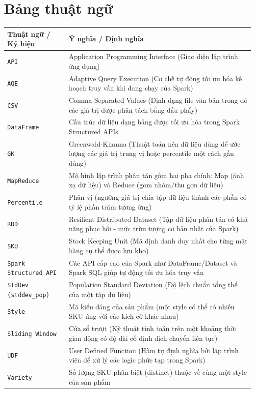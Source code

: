 \section*{Bảng thuật ngữ}

\begin{spacing}{1.15}
\noindent
\small
\begin{tabularx}{\linewidth}{l L}
\toprule
\textbf{Thuật ngữ / Ký hiệu} & \textbf{Ý nghĩa / Định nghĩa} \\
\midrule
\texttt{API} & Application Programming Interface (Giao diện lập trình ứng dụng) \\
\texttt{AQE} & Adaptive Query Execution (Cơ chế tự động tối ưu hóa kế hoạch truy vấn khi đang chạy của Spark) \\
\texttt{CSV} & Comma-Separated Values (Định dạng file văn bản trong đó các giá trị được phân tách bằng dấu phẩy) \\
\texttt{DataFrame} & Cấu trúc dữ liệu dạng bảng được tối ưu hóa trong Spark Structured APIs \\
\texttt{GK} & Greenwald-Khanna (Thuật toán nén dữ liệu dùng để ước lượng các giá trị trung vị hoặc percentile một cách gần đúng) \\
\texttt{MapReduce} & Mô hình lập trình phân tán gồm hai pha chính: Map (ánh xạ dữ liệu) và Reduce (gom nhóm/thu gọn dữ liệu) \\
\texttt{Percentile} & Phân vị (ngưỡng giá trị chia tập dữ liệu thành các phần có tỷ lệ phần trăm tương ứng) \\
\texttt{RDD} & Resilient Distributed Dataset (Tập dữ liệu phân tán có khả năng phục hồi - mức trừu tượng cơ bản nhất của Spark) \\
\texttt{SKU} & Stock Keeping Unit (Mã định danh duy nhất cho từng mặt hàng cụ thể được lưu kho) \\
\texttt{Spark Structured API} & Các API cấp cao của Spark như DataFrame/Dataset và Spark SQL giúp tự động tối ưu hóa truy vấn \\
\texttt{StdDev (stddev\_pop)} & Population Standard Deviation (Độ lệch chuẩn tổng thể của một tập dữ liệu) \\
\texttt{Style} & Mã kiểu dáng của sản phẩm (một style có thể có nhiều SKU ứng với các kích cỡ khác nhau) \\
\texttt{Sliding Window} & Cửa sổ trượt (Kỹ thuật tính toán trên một khoảng thời gian động có độ dài cố định dịch chuyển liên tục) \\
\texttt{UDF} & User Defined Function (Hàm tự định nghĩa bởi lập trình viên để xử lý các logic phức tạp trong Spark) \\
\texttt{Variety} & Số lượng SKU phân biệt (distinct) thuộc về cùng một style của sản phẩm \\
\bottomrule
\end{tabularx}
\end{spacing}
